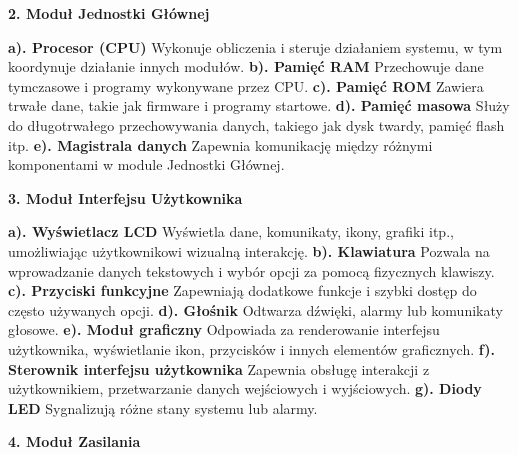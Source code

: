 \documentclass{article}
\begin{document}
\large
\begin{center}
    \textbf{2. Moduł Jednostki Głównej} 
\end{center}
\begin{flushleft}
    \textbf{a). Procesor (CPU)} Wykonuje obliczenia i steruje działaniem systemu, w tym koordynuje działanie innych modułów. \newline
    \textbf{b). Pamięć RAM} Przechowuje dane tymczasowe i programy wykonywane przez CPU. \newline
    \textbf{c). Pamięć ROM} Zawiera trwałe dane, takie jak firmware i programy startowe. \newline
    \textbf{d). Pamięć masowa} Służy do długotrwałego przechowywania danych, takiego jak dysk twardy, pamięć flash itp. \newline
    \textbf{e). Magistrala danych} Zapewnia komunikację między różnymi komponentami w module Jednostki Głównej. \newline
\end{flushleft}
\large
\begin{center}
    \textbf{3. Moduł Interfejsu Użytkownika} 
\end{center}
\begin{flushleft}
    \textbf{a). Wyświetlacz LCD} Wyświetla dane, komunikaty, ikony, grafiki itp., umożliwiając użytkownikowi wizualną interakcję. \newline
    \textbf{b). Klawiatura} Pozwala na wprowadzanie danych tekstowych i wybór opcji za pomocą fizycznych klawiszy. \newline
    \textbf{c). Przyciski funkcyjne} Zapewniają dodatkowe funkcje i szybki dostęp do często używanych opcji. \newline
    \textbf{d). Głośnik} Odtwarza dźwięki, alarmy lub komunikaty głosowe. \newline
    \textbf{e). Moduł graficzny} Odpowiada za renderowanie interfejsu użytkownika, wyświetlanie ikon, przycisków i innych elementów graficznych. \newline
    \textbf{f). Sterownik interfejsu użytkownika} Zapewnia obsługę interakcji z użytkownikiem, przetwarzanie danych wejściowych i wyjściowych. \newline
    \textbf{g). Diody LED} Sygnalizują różne stany systemu lub alarmy. \newline
\end{flushleft}
\large
\begin{center}
    \textbf{4. Moduł Zasilania} 
\end{center}
\end{document}
